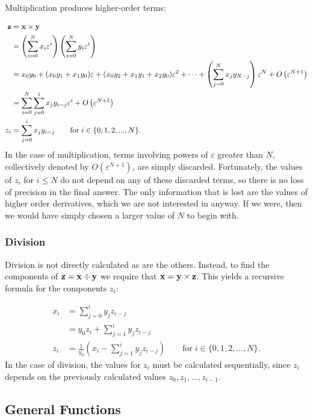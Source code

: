 \documentclass{article}
\begin{document}
Multiplication produces higher-order terms:

\begin{align*}
{\bf z} &= {\bf x} \times {\bf y} \\
 &= \left(\sum_{i=0}^Nx_i\varepsilon^i\right) \left(\sum_{i=0}^Ny_i\varepsilon^i\right) \\
 &= x_0y_0 + (x_0y_1+x_1y_0)\varepsilon + (x_0y_2+x_1y_1+x_2y_0)\varepsilon^2 + \cdots +
    \left(\sum_{j=0}^Nx_jy_{N-j}\right)\varepsilon^N + O\left(\varepsilon^{N+1}\right) \\
 &= \sum_{i=0}^N\sum_{j=0}^ix_jy_{i-j}\varepsilon^i + O\left(\varepsilon^{N+1}\right) \\
z_i &= \sum_{j=0}^ix_jy_{i-j} \qquad \text{for}\; i\in\{0,1,2,...,N\}.
\end{align*}
In the case of multiplication, terms involving powers of $\varepsilon$ greater than $N$, collectively denoted
by $O\left(\varepsilon^{N+1}\right)$, are simply discarded. Fortunately, the values of $z_i$ for $i\le N$ do not
depend on any of these discarded terms, so there is no loss of precision in the final answer. The only information
that is lost are the values of higher order derivatives, which we are not interested in anyway. If we were, then
we would have simply chosen a larger value of $N$ to begin with.

\subsubsection{Division}

Division is not directly calculated as are the others. Instead, to find the components of
${\bf z}={\bf x}\div{\bf y}$ we require that ${\bf x}={\bf y}\times{\bf z}$. This yields
a recursive formula for the components $z_i$:

\begin{align*}
x_i &= \sum_{j=0}^iy_jz_{i-j} \\
 &= y_0z_i + \sum_{j=1}^iy_jz_{i-j} \\
z_i &= \frac{1}{y_0}\left(x_i - \sum_{j=1}^iy_jz_{i-j}\right) \qquad \text{for}\; i\in\{0,1,2,...,N\}.
\end{align*}
In the case of division, the values for $z_i$ must be calculated sequentially, since $z_i$
depends on the previously calculated values $z_0, z_1, ..., z_{i-1}$.

\subsection{General Functions}
\end{document}
